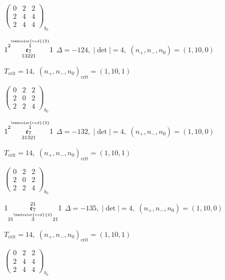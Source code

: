 \documentclass[10pt]{article}
\begin{document}
\hspace{2em}$\left(\begin{smallmatrix}0 & 2 & 2 \\ 2 & 4 & 4 \\ 2 & 4 & 4\end{smallmatrix}\right)_{\!b_0}$

\smallskip

$1\overset{2\overset{\textcolor{red}{2}}{1}}{\underset{13221}{\mathfrak{e}_7}}1$ \quad $\Delta=-124,\; |\det|=4,\; (n_+,n_-,n_0)=(1,10,0)$

\hspace{1em}$T_{\text{crit}}=14,\; (n_+,n_-,n_0)_{\text{crit}}=(1,10,1)$

\hspace{2em}$\left(\begin{smallmatrix}0 & 2 & 2 \\ 2 & 0 & 2 \\ 2 & 2 & 4\end{smallmatrix}\right)_{\!b_0}$

\smallskip

$1\overset{2\overset{\textcolor{red}{2}}{1}}{\underset{31321}{\mathfrak{e}_7}}1$ \quad $\Delta=-132,\; |\det|=4,\; (n_+,n_-,n_0)=(1,10,0)$

\hspace{1em}$T_{\text{crit}}=14,\; (n_+,n_-,n_0)_{\text{crit}}=(1,10,1)$

\hspace{2em}$\left(\begin{smallmatrix}0 & 2 & 2 \\ 2 & 0 & 2 \\ 2 & 2 & 4\end{smallmatrix}\right)_{\!b_0}$

$1\overset{21}{\underset{31\overset{\textcolor{red}{2}}{3}21}{\mathfrak{e}_7}}1$ \quad $\Delta=-135,\; |\det|=4,\; (n_+,n_-,n_0)=(1,10,0)$

\hspace{1em}$T_{\text{crit}}=14,\; (n_+,n_-,n_0)_{\text{crit}}=(1,10,1)$

\hspace{2em}$\left(\begin{smallmatrix}0 & 2 & 2 \\ 2 & 4 & 4 \\ 2 & 4 & 4\end{smallmatrix}\right)_{\!b_0}$
\end{document}
